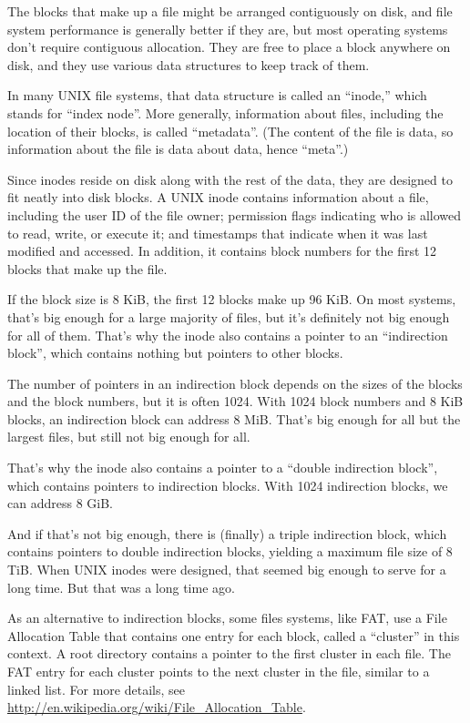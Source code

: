 \documentclass[12pt]{book}
\begin{document}
{The blocks that make up a file might be arranged contiguously on
disk, and file system performance is generally better if they are,
but most operating systems don't require contiguous allocation.
They are free to place a block anywhere on disk, and they use
various data structures to keep track of them.

In many UNIX file systems, that data structure is called an ``inode,''
which stands for ``index node''.  More generally, information about
files, including the location of their blocks, is called ``metadata''.
(The content of the file is data, so information about the file is
data about data, hence ``meta''.)

Since inodes reside on disk along with the rest of the data, they are
designed to fit neatly into disk blocks.  A UNIX inode contains
information about a file, including the user ID of the file owner;
permission flags indicating who is allowed to read, write, or execute
it; and timestamps that indicate when it was last modified and
accessed.  In addition, it contains block numbers for the first 12
blocks that make up the file.

If the block size is 8 KiB, the first 12 blocks make up 96 KiB.
On most systems, that's big enough for a large majority of files,
but it's definitely not big enough for all of them.  That's
why the inode also contains a pointer to an ``indirection block'',
which contains nothing but pointers to other blocks.

The number of pointers in an indirection block depends on the sizes of
the blocks and the block numbers, but it is often 1024.  With 1024
block numbers and 8 KiB blocks, an indirection block can address 8
MiB.  That's big enough for all but the largest files, but still not
big enough for all.

That's why the inode also contains a pointer to a ``double indirection
block'', which contains pointers to indirection blocks.  With
1024 indirection blocks, we can address 8 GiB.

And if that's not big enough, there is (finally) a triple indirection
block, which contains pointers to double indirection blocks, yielding
a maximum file size of 8 TiB.  When UNIX inodes were designed, that
seemed big enough to serve for a long time.  But that was a long time
ago.

As an alternative to indirection blocks, some files systems, like FAT,
use a File Allocation Table that contains one entry for each block,
called a ``cluster'' in this context.  A root directory contains a
pointer to the first cluster in each file.  The FAT entry for each
cluster points to the next cluster in the file, similar to a linked
list.  For more details, see
\url{http://en.wikipedia.org/wiki/File_Allocation_Table}.


}
\end{document}
